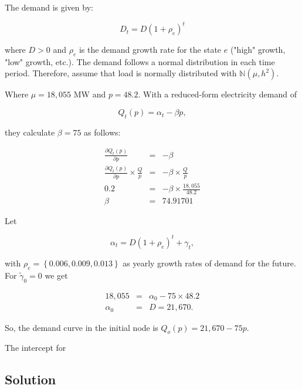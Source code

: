 The demand is given by:

\begin{equation}
  \label{eq:demandgrowth}
  D_t = D(1+\rho_e)^t
\end{equation}

where $D>0$ and $\rho_e$ is the demand growth rate for the state $e$ ("high" growth, "low" growth, etc.). The demand follows a normal distribution in each time period. Therefore, \cite{Genc2008} assume that load is normally distributed with $\mathbb{N}(\mu, h^2)$.

Where $\mu=18,055$ MW and $p=48.2$. With a reduced-form electricity demand of

\begin{equation}
  \label{eq:5}
  Q_t(p) = \alpha_t-\beta p, 
\end{equation}

they calculate $\beta=75$ as follows:

\begin{eqnarray*}
  \frac{\partial Q_t(p)}{\partial p} &=& -\beta \\
  \frac{\partial Q_t(p)}{\partial p}\times\frac{Q}{p} &=& -\beta\times\frac{Q}{p} \\
  0.2 &=& -\beta\times\frac{18,055}{48.2}\\
\beta &=& 74.91701
\end{eqnarray*}


Let

\begin{equation*}
  \alpha_t=D(1+\rho_e)^t+\gamma_t,
\end{equation*}

with $\rho_e = \left\{0.006, 0.009, 0.013\right\}$ as yearly growth rates of demand for the future. For $\tilde{\gamma}_0=0$ we get

\begin{eqnarray*}
  18,055 &=& \alpha_0-75\times 48.2\\
  \alpha_0 &=&D=21,670.
\end{eqnarray*}

So, the demand curve in the initial node is $Q_o(p) = 21,670-75p$.

The intercept for 


\subsection{Solution}
\label{sec:solution}


